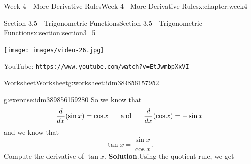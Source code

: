 \documentclass[oneside,10pt,]{book}
\newcommand{\blocktitlefont}{\relax}
\newcommand{\mono}[1]{\texttt{#1}}
\numberwithin{equation}{section}
\newlength{\qrsize}
\newlength{\previewwidth}
\begin{document}
\begin{chapterptx}{Week 4 - More Derivative Rules}{}{Week 4 - More Derivative Rules}{}{}{x:chapter:week4}
%
%
\typeout{************************************************}
\typeout{************************************************}
%
\begin{sectionptx}{Section 3.5 - Trigonometric Functions}{}{Section 3.5 - Trigonometric Functions}{}{}{x:section:section3_5}
\setlength{\qrsize}{9em}
\setlength{\previewwidth}{\linewidth}
\addtolength{\previewwidth}{-\qrsize}
\begin{tcbraster}[raster columns=2, raster column skip=1pt, raster halign=center, raster force size=false, raster left skip=0pt, raster right skip=0pt]%
\begin{tcolorbox}[previewstyle, width=\previewwidth]%
\texttt{[image: images/video-26.jpg]}%
\end{tcolorbox}%
\begin{tcolorbox}[qrstyle]%
{\hypersetup{urlcolor=black}}%
\end{tcolorbox}%
\begin{tcolorbox}[captionstyle]%
\small YouTube: \mono{https://www.youtube.com/watch?v=EtJwmbpXxVI}\end{tcolorbox}%
\end{tcbraster}%
%
%
\typeout{************************************************}
\typeout{************************************************}
%
\begin{worksheet-subsection}{Worksheet}{}{Worksheet}{}{}{g:worksheet:idm389856157952}
\begin{divisionexercise}{1}{}{}{g:exercise:idm389856159280}%
So we know that%
\begin{equation*}
\frac{d}{dx} ( \sin x ) = \cos x \hspace{.2in} \text{ and } \hspace{.2in} \frac{d}{dx} (\cos x) = - \sin x 
\end{equation*}
and we know that%
\begin{equation*}
\tan x = \frac{\sin x}{\cos x} . 
\end{equation*}
Compute the derivative of \(\tan x\).%
\textbf{\blocktitlefont Solution}.\hypertarget{g:solution:idm389856168608}{}\quad{}Using the quotient rule, we get%
\begin{equation*}

\end{equation*}
\end{divisionexercise}
\end{worksheet-subsection}
\end{sectionptx}
\end{chapterptx}
\end{document}
